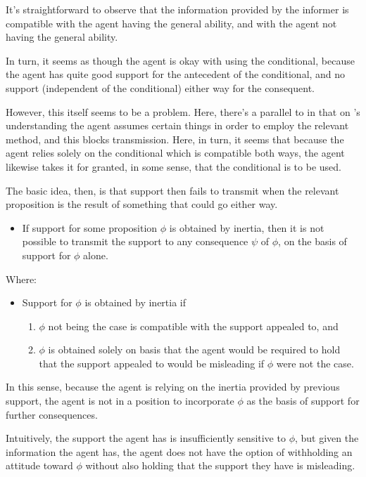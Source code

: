 \documentclass[10pt]{article}
\begin{document}
\begin{note}
  It's straightforward to observe that the information provided by the informer is compatible with the agent having the general ability, and with the agent not having the general ability.

  In turn, it seems as though the agent is okay with using the conditional, because the agent has quite good support for the antecedent of the conditional, and no support (independent of the conditional) either way for the consequent.

  However, this itself seems to be a problem.
  Here, there's a parallel to \citeauthor{Wright:2016wl} in that on \citeauthor{Wright:2016wl}'s understanding the agent assumes certain things in order to employ the relevant method, and this blocks transmission.
  Here, in turn, it seems that because the agent relies solely on the conditional which is compatible both ways, the agent likewise takes it for granted, in some sense, that the conditional is to be used.

  The basic idea, then, is that support then fails to transmit when the relevant proposition is the result of something that could go either way.

  \begin{itemize}
  \item If support for some proposition \(\phi\) is obtained by inertia, then it is not possible to transmit the support to any consequence \(\psi\) of \(\phi\), on the basis of support for \(\phi\) alone.
  \end{itemize}
  Where:
  \begin{itemize}
  \item Support for \(\phi\) is obtained by inertia if
    \begin{enumerate}
    \item \(\phi\) not being the case is compatible with the support appealed to, and
    \item \(\phi\) is obtained solely on basis that the agent would be required to hold that the support appealed to would be misleading if \(\phi\) were not the case.
    \end{enumerate}
  \end{itemize}
  In this sense, because the agent is relying on the inertia provided by previous support, the agent is not in a position to incorporate \(\phi\) as the basis of support for further consequences.

  Intuitively, the support the agent has is insufficiently sensitive to \(\phi\), but given the information the agent has, the agent does not have the option of withholding an attitude toward \(\phi\) without also holding that the support they have is misleading.


\end{note}
\end{document}
